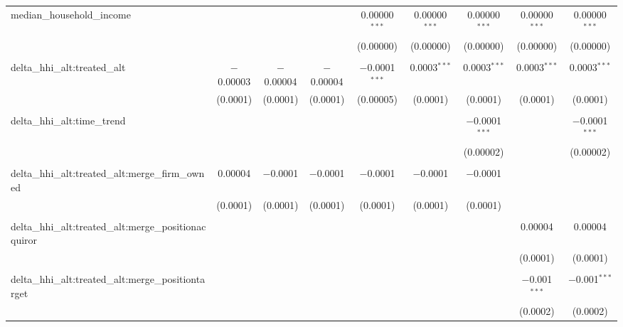 \begin{table}[H]
{\begin{tabular}{@{\extracolsep{5pt}}lcccccccc}
  median\_household\_income &  &  &  & 0.00000$^{***}$ & 0.00000$^{***}$ & 0.00000$^{***}$ & 0.00000$^{***}$ & 0.00000$^{***}$ \\  

   &  &  &  & (0.00000) & (0.00000) & (0.00000) & (0.00000) & (0.00000) \\  

   & & & & & & & & \\  

  delta\_hhi\_alt:treated\_alt & $-$0.00003 & $-$0.00004 & $-$0.00004 & $-$0.0001$^{***}$ & 0.0003$^{***}$ & 0.0003$^{***}$ & 0.0003$^{***}$ & 0.0003$^{***}$ \\  

   & (0.0001) & (0.0001) & (0.0001) & (0.00005) & (0.0001) & (0.0001) & (0.0001) & (0.0001) \\  

   & & & & & & & & \\  

  delta\_hhi\_alt:time\_trend &  &  &  &  &  & $-$0.0001$^{***}$ &  & $-$0.0001$^{***}$ \\  

   &  &  &  &  &  & (0.00002) &  & (0.00002) \\  

   & & & & & & & & \\  

  delta\_hhi\_alt:treated\_alt:merge\_firm\_owned & 0.00004 & $-$0.0001 & $-$0.0001 & $-$0.0001 & $-$0.0001 & $-$0.0001 &  &  \\  

   & (0.0001) & (0.0001) & (0.0001) & (0.0001) & (0.0001) & (0.0001) &  &  \\  

   & & & & & & & & \\  

  delta\_hhi\_alt:treated\_alt:merge\_positionacquiror &  &  &  &  &  &  & 0.00004 & 0.00004 \\  

   &  &  &  &  &  &  & (0.0001) & (0.0001) \\  

   & & & & & & & & \\  

  delta\_hhi\_alt:treated\_alt:merge\_positiontarget &  &  &  &  &  &  & $-$0.001$^{***}$ & $-$0.001$^{***}$ \\  

   &  &  &  &  &  &  & (0.0002) & (0.0002) \\  


\end{tabular}}
\end{table}
